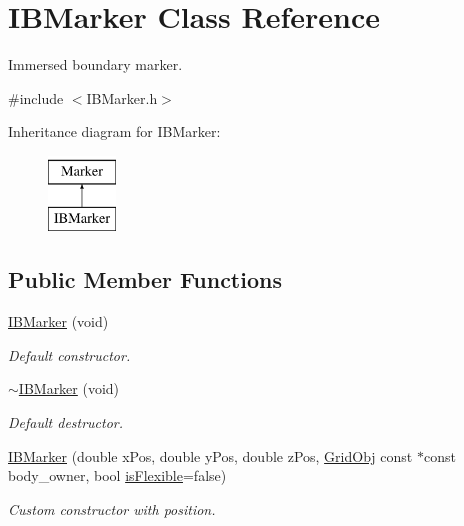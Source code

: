 \hypertarget{class_i_b_marker}{}\section{I\+B\+Marker Class Reference}
\label{class_i_b_marker}


Immersed boundary marker.  




{\ttfamily \#include $<$I\+B\+Marker.\+h$>$}

Inheritance diagram for I\+B\+Marker\+:\begin{figure}[H]
\begin{center}
\leavevmode
\includegraphics[height=2.000000cm]{class_i_b_marker}
\end{center}
\end{figure}
\subsection*{Public Member Functions}
\begin{DoxyCompactItemize}
\item 
\hyperlink{class_i_b_marker_ab45e9679ae96b75ab7655e738807bb41}{I\+B\+Marker} (void)
\begin{DoxyCompactList}\small\item\em Default constructor. \end{DoxyCompactList}\item 
\hyperlink{class_i_b_marker_a0f3e177c42c3d616a2bbf96c0a9c1099}{$\sim$\+I\+B\+Marker} (void)
\begin{DoxyCompactList}\small\item\em Default destructor. \end{DoxyCompactList}\item 
\hyperlink{class_i_b_marker_a85e4b09f83c97e3dacfa2615d5907e62}{I\+B\+Marker} (double x\+Pos, double y\+Pos, double z\+Pos, \hyperlink{class_grid_obj}{Grid\+Obj} const $\ast$const body\+\_\+owner, bool \hyperlink{class_i_b_marker_a190d90424dc97a7d83669f81dd8273a8}{is\+Flexible}=false)
\begin{DoxyCompactList}\small\item\em Custom constructor with position. \end{DoxyCompactList}\end{DoxyCompactItemize}
